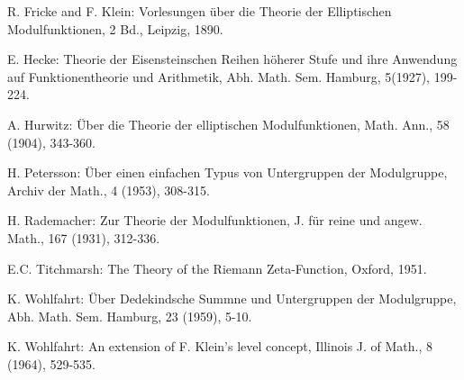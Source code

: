 \begin{thebibliography}{99}\pageoriginale
{} R. Fricke and F. Klein: Vorlesungen \"uber die Theorie
  der Elliptischen Modulfunktionen, 2 Bd., Leipzig, 1890.

 E. Hecke: Theorie der Eisensteinschen Reihen h\"oherer
  Stufe und ihre Anwendung auf Funktionentheorie und Arithmetik,
  Abh. Math. Sem. Hamburg, 5(1927), 199-224.

 A. Hurwitz: \"Uber die Theorie der elliptischen
  Modulfunktionen, Math. Ann., 58 (1904), 343-360.

 H. Petersson: \"Uber einen einfachen Typus von
  Untergruppen der Modulgruppe, Archiv der Math., 4 (1953), 308-315.

 H. Rademacher: Zur Theorie der Modulfunktionen,
  J. f\"ur reine und angew. Math., 167 (1931), 312-336.

 E.C. Titchmarsh: The Theory of the Riemann
  Zeta-Function, Oxford, 1951.

 K. Wohlfahrt: \"Uber Dedekindsche Summne und
  Untergruppen der Modulgruppe,  Abh. Math. Sem. Hamburg, 23 (1959),
  5-10. 

 K. Wohlfahrt: An extension of F. Klein's level concept,
  Illinois J. of Math., 8 (1964), 529-535.
\end{thebibliography}
